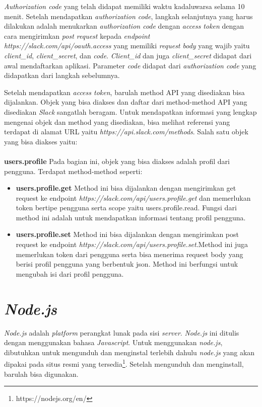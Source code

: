 \textit{Authorization code} yang telah didapat memiliki waktu kadaluwarsa selama 10 menit. Setelah mendapatkan \textit{authorization code}, langkah selanjutnya yang harus dilakukan adalah menukarkan \textit{authorization code} dengan \textit{access token} dengan cara mengirimkan \textit{post request} kepada \textit{endpoint} \textit{https://slack.com/api/oauth.access} yang memiliki \textit{request body} yang wajib yaitu \textit{client\_id}, \textit{client\_secret}, dan \textit{code}. \textit{Client\_id} dan juga \textit{client\_secret} didapat dari awal mendaftarkan aplikasi. Parameter \textit{code} didapat dari \textit{authorization code} yang didapatkan dari langkah sebelumnya.

Setelah mendapatkan \textit{access token}, barulah method API yang disediakan bisa dijalankan.
Objek yang bisa diakses dan daftar dari method-method API yang disediakan \textit{Slack} sangatlah beragam. Untuk mendapatkan informasi yang lengkap mengenai objek dan method yang disediakan, bisa melihat referensi yang terdapat di alamat URL yaitu \textit{https://api.slack.com/methods}. Salah satu objek yang bisa diakses yaitu:\\
\\
\textbf{users.profile}
Pada bagian ini, objek yang bisa diakses adalah profil dari pengguna. Terdapat method-method seperti:
\begin{itemize}
	\item \textbf{users.profile.get}
	Method ini bisa dijalankan dengan mengirimkan get request ke endpoint \textit{https://slack.com/api/users.profile.get} dan memerlukan token bertipe pengguna serta scope yaitu users.profile.read. Fungsi dari method ini adalah untuk mendapatkan informasi tentang profil pengguna. 
	\item \textbf{users.profile.set}
	Method ini bisa dijalankan dengan mengirimkan post request ke endpoint \textit{	https://slack.com/api/users.profile.set}.Method ini juga memerlukan token dari pengguna serta bisa menerima request body yang berisi profil pengguna yang berbentuk json. Method ini berfungsi untuk mengubah isi dari profil pengguna. 
\end{itemize}

\section{\textit{Node.js}}
\label{sec:nodejs}
\textit{Node.js} adalah \textit{platform} perangkat lunak pada sisi \textit{server}. \textit{Node.js} ini ditulis dengan menggunakan bahasa \textit{Javascript}. Untuk menggunakan \textit{node.js}, dibutuhkan untuk mengunduh dan menginstal terlebih dahulu \textit{node.js} yang akan dipakai pada situs resmi yang tersedia\footnote{https://nodejs.org/en/}. Setelah mengunduh dan menginstall, barulah bisa digunakan. 

